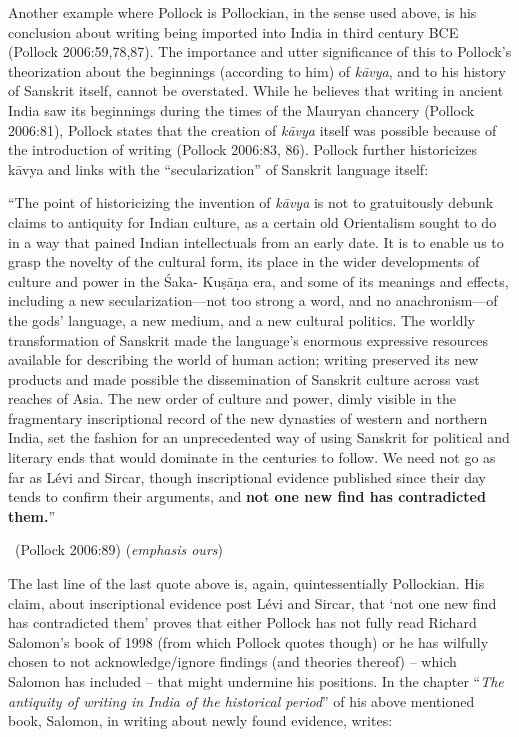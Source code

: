 Another example where Pollock is Pollockian, in the sense used above, is his conclusion about writing being imported into India in third century BCE (Pollock 2006:59,78,87). The importance and utter significance of this to Pollock’s theorization about the beginnings (according to him) of \textit{kāvya}, and to his history of Sanskrit itself, cannot be overstated. While he believes that writing in ancient India saw its beginnings during the times of the Mauryan chancery (Pollock 2006:81), Pollock states that the creation of \textit{kāvya} itself was possible because of the introduction of writing (Pollock 2006:83, 86). Pollock further historicizes kāvya and links with the “secularization” of Sanskrit language itself: 

\vskip 4pt

\begin{myquote}
“The point of historicizing the invention of \textit{kāvya} is not to gratuitously debunk claims to antiquity for Indian culture, as a certain old Orientalism sought to do in a way that pained Indian intellectuals from an early date. It is to enable us to grasp the novelty of the cultural form, its place in the wider developments of culture and power in the Śaka- Kuṣāṇa era, and some of its meanings and effects, including a new secularization—not too strong a word, and no anachronism—of the gods’ language, a new medium, and a new cultural politics. The worldly transformation of Sanskrit made the language’s enormous expressive resources available for describing the world of human action; writing preserved its new products and made possible the dissemination of Sanskrit culture across vast reaches of Asia. The new order of culture and power, dimly visible in the fragmentary inscriptional record of the new dynasties of western and northern India, set the fashion for an unprecedented way of using Sanskrit for political and literary ends that would dominate in the centuries to follow. We need not go as far as Lévi and Sircar, though inscriptional evidence published since their day tends to confirm their arguments, and \textbf{not one new find has contradicted them.}” 

~\hfill (Pollock 2006:89) (\textit{emphasis ours})
\end{myquote}

\vskip 4pt

The last line of the last quote above is, again, quintessentially Pollockian. His claim, about inscriptional evidence post Lévi and Sircar, that ‘not one new find has contradicted them’ proves that either Pollock has not fully read Richard Salomon’s book of 1998 (from which Pollock quotes though) or he has wilfully chosen to not acknowledge/ignore findings (and theories thereof) – which Salomon has included – that might undermine his positions. In the chapter “\textit{The antiquity of writing in India of the historical period}” of his above mentioned book, Salomon, in writing about newly found evidence, writes:

